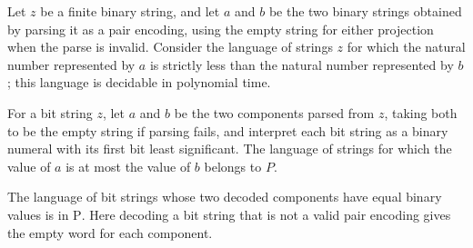 \begin{theorem}
\label{Complexity.BinArith.lt_mem_P}
\leanok
{}
Let $z$ be a finite binary string, and let $a$ and $b$ be the two binary strings
obtained by parsing it as a pair encoding, using the empty string for either projection
when the parse is invalid. Consider the language of strings $z$ for which the natural
number represented by $a$ is strictly less than the natural number represented by $b$;
this language is decidable in polynomial time.
\end{theorem}

\begin{theorem}
\label{Complexity.BinArith.le_mem_P}
\leanok
{}
For a bit string $z$, let $a$ and $b$ be the two components parsed from $z$, taking both
to be the empty string if parsing fails, and interpret each bit string as a binary
numeral with its first bit least significant. The language of strings for which the
value of $a$ is at most the value of $b$ belongs to $P$.
\end{theorem}

\begin{theorem}
\label{Complexity.BinArith.beq_mem_P}
\leanok
{}
The language of bit strings whose two decoded components have equal binary values is in
$\mathrm{P}$. Here decoding a bit string that is not a valid pair encoding gives the
empty word for each component.
\end{theorem}
